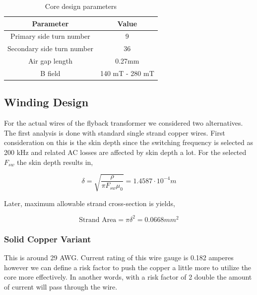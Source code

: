 \documentclass[12pt]{article}
\begin{document}
        \begin{table}[H]
        \centering
        \caption{Core design parameters}
        \begin{tabular}{|c|c|}
        \hline
        \textbf{Parameter}         & \textbf{Value} \\ \hline
        Primary side turn number   & 9              \\ \hline
        Secondary side turn number & 36             \\ \hline
        Air gap length             & 0.27mm         \\ \hline
        B field                    & 140 mT - 280 mT \\ \hline
        \end{tabular}
        \label{tab:core}
        \end{table}

    
    \subsection{Winding Design}
    For the actual wires of the flyback transformer we considered two alternatives. The first analysis is done with standard single strand copper wires. First consideration on this is the skin depth since the switching frequency is selected as 200 kHz and related AC losses are affected by skin depth a lot. For the selected $F_{sw}$ the skin depth results in,

    \begin{equation*}
        \delta = \sqrt{\frac{\rho}{\pi F_{sw} \mu_0 }} = 1.4587\cdot 10^{-4}m
    \end{equation*}

    Later, maximum allowable strand cross-section is yields,
    
    \begin{equation*}
        \textrm{Strand Area} = \pi \delta ^2  = 0.0668 mm^2 
    \end{equation*}

    \subsubsection{Solid Copper Variant}

    
    This is around 29 AWG. Current rating of this wire gauge is 0.182 amperes however we can define a risk factor to push the copper a little more to utilize the core more effectively. In another words, with a risk factor of 2 double the amount of current will pass through the wire.
\end{document}
